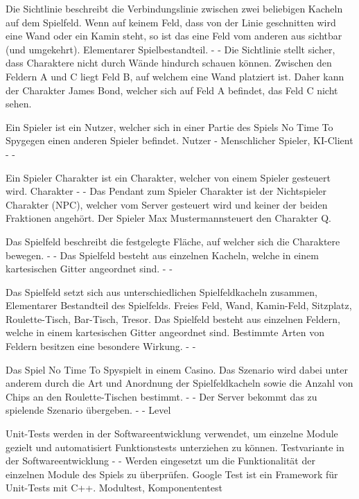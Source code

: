 {Die Sichtlinie beschreibt die Verbindungslinie zwischen zwei beliebigen Kacheln auf dem Spielfeld. Wenn auf keinem Feld, dass von der Linie geschnitten wird eine Wand oder ein Kamin steht, so ist das eine Feld vom anderen aus sichtbar (und umgekehrt).}
{Elementarer Spielbestandteil.}
{-}
{-}
{Die Sichtlinie stellt sicher, dass Charaktere nicht durch Wände hindurch schauen können.}
{Zwischen den Feldern A und C liegt Feld B, auf welchem eine Wand platziert ist. Daher kann der Charakter \glqq James Bond\grqq, welcher sich auf Feld A befindet, das Feld C nicht sehen.}

{Ein Spieler ist ein Nutzer, welcher sich in einer Partie des Spiels \glqq No Time To Spy\grqq gegen einen anderen Spieler befindet.}
{Nutzer}
{-}
{Menschlicher Spieler, KI-Client}
{-}
{-}

{Ein Spieler Charakter ist ein Charakter, welcher von einem Spieler gesteuert wird.}
{Charakter}
{-}
{-}
{Das Pendant zum Spieler Charakter ist der Nichtspieler Charakter (NPC), welcher vom Server gesteuert wird und keiner der beiden Fraktionen angehört.}
{Der Spieler \glqq Max Mustermann\grqq steuert den Charakter \glqq Q\grqq.}

{Das Spielfeld beschreibt die festgelegte Fläche, auf welcher sich die Charaktere bewegen.}
{-}
{-}
{Das Spielfeld besteht aus einzelnen Kacheln, welche in einem kartesischen Gitter angeordnet sind.}
{-}
{-}

{Das Spielfeld setzt sich aus unterschiedlichen Spielfeldkacheln zusammen, }
{Elementarer Bestandteil des Spielfelds.}
{Freies Feld, Wand, Kamin-Feld, Sitzplatz, Roulette-Tisch, Bar-Tisch, Tresor.}
{Das Spielfeld besteht aus einzelnen Feldern, welche in einem kartesischen Gitter angeordnet sind.}
{Bestimmte Arten von Feldern besitzen eine besondere Wirkung.}
{-}
{-}

{Das Spiel \glqq No Time To Spy\grqq spielt in einem Casino. Das Szenario wird dabei unter anderem durch die Art und Anordnung der Spielfeldkacheln sowie die Anzahl von Chips an den Roulette-Tischen bestimmt. }
{-}
{-}
{Der Server bekommt das zu spielende Szenario übergeben.}
{-}
{-}
{Level}

{Unit-Tests werden in der Softwareentwicklung verwendet, um einzelne Module gezielt und automatisiert Funktionstests unterziehen zu können.}
{Testvariante in der Softwareentwicklung}
{-}
{-}
{Werden eingesetzt um die Funktionalität der einzelnen Module des Spiels zu überprüfen.}
{Google Test ist ein Framework für Unit-Tests mit C++.}
{Modultest, Komponententest}

